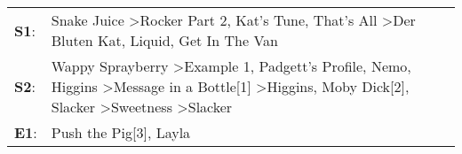 \begin{supertabular}{p{0.03\textwidth}p{0.92\textwidth}}
 \textbf{S1}:  &                                                                                                                                                                                                 Snake Juice\textsuperscript{} \textgreater \enspace Rocker Part 2\textsuperscript{}, \enspace Kat's Tune\textsuperscript{}, \enspace That's All\textsuperscript{} \textgreater \enspace Der Bluten Kat\textsuperscript{}, \enspace Liquid\textsuperscript{}, \enspace Get In The Van\textsuperscript{}  \enspace  \\
 \textbf{S2}:  &  Wappy Sprayberry\textsuperscript{} \textgreater \enspace Example 1\textsuperscript{}, \enspace Padgett's Profile\textsuperscript{}, \enspace Nemo\textsuperscript{}, \enspace Higgins\textsuperscript{} \textgreater \enspace Message in a Bottle[1]\textsuperscript{} \textgreater \enspace Higgins\textsuperscript{}, \enspace Moby Dick[2]\textsuperscript{}, \enspace Slacker\textsuperscript{} \textgreater \enspace Sweetness\textsuperscript{} \textgreater \enspace Slacker\textsuperscript{}  \enspace  \\
 \textbf{E1}:  &                                                                                                                                                                                                                                                                                                                                                                                                                                    Push the Pig[3]\textsuperscript{}, \enspace Layla\textsuperscript{}  \enspace  \\
\end{supertabular}
